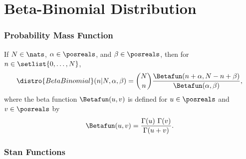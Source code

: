 \begin{description}
%
%
\end{description}



\section{Beta-Binomial Distribution}

\subsubsection{Probability Mass Function}

If $N \in \nats$, $\alpha \in \posreals$, and $\beta \in \posreals$,
then for $n \in \setlist{0,\ldots,N}$,
\[
\distro{BetaBinomial}(n|N,\alpha,\beta)
= 
\binom{N}{n} \frac{\Betafun(n+\alpha, N -n +
  \beta)}{\Betafun(\alpha,\beta)},
\]
%
where the beta function $\Betafun(u,v)$ is defined for $u \in
\posreals$ and $v \in \posreals$ by
%
\[
\Betafun(u,v)
= \frac{\Gamma(u) \ \Gamma(v)}{\Gamma(u + v)}.
\]


\subsubsection{Stan Functions}

